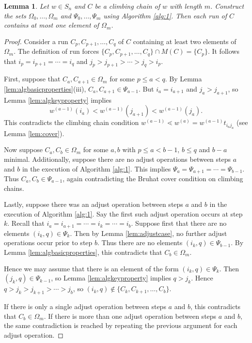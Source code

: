 \documentclass[11pt]{amsart}
\newtheorem{lemma}[theorem]{Lemma}
\theoremstyle{definition}
\theoremstyle{named}
\begin{document}
	\begin{lemma}
		\label{lem:atmostoneperrun}
		Let $w\in S_n$ and $C$ be a climbing chain of $w$ with length $m$. Construct the sets $\Omega_0,\ldots,\Omega_m$ and $\Psi_0,\ldots,\Psi_m$ using Algorithm \ref{alg:1}. Then each run of $C$ contains at most one element of $\Omega_m$.
	\end{lemma}
	\begin{proof}
		Consider a run $C_{p},C_{p+1},\ldots,C_{q}$ of $C$ containing at least two elements of $\Omega_m$. The definition of run forces $\{C_p,C_{p+1},\ldots,C_q\}\cap M(C) = \{C_p\}$. It follows that $i_p=i_{p+1}=\cdots=i_{q}$ and $j_p>j_{p+1}>\cdots>j_q>i_p$. 
		
		First, suppose that $C_a,C_{a+1}\in \Omega_m$ for some $p\leq a< q$. By Lemma \ref{lem:algbasicproperties}(iii), $C_a,C_{a+1}\in \Psi_{a-1}$. But $i_a=i_{a+1}$ and $j_a>j_{a+1}$, so Lemma \ref{lem:algkeyproperty} implies
		\[w^{(a-1)}(i_a) < w^{(a-1)}(j_{a+1}) < w^{(a-1)}(j_a). \]
		This contradicts the climbing chain condition $w^{(a-1)}\lessdot w^{(a)} = w^{(a-1)}t_{i_aj_a}$ (see Lemma \ref{lem:cover}).

		Now suppose $C_a,C_b\in \Omega_m$ for some $a,b$ with $p\leq a<b-1$, $b\leq q$ and $b-a$ minimal. Additionally, suppose there are no adjust operations between steps $a$ and $b$ in the execution of Algorithm \ref{alg:1}. This implies $\Psi_a=\Psi_{a+1}=\cdots=\Psi_{b-1}$. Thus $C_a,C_b\in \Psi_{a-1}$, again contradicting the Bruhat cover condition on climbing chains.
		
		Lastly, suppose there was an adjust operation between steps $a$ and $b$ in the execution of Algorithm \ref{alg:1}. Say the first such adjust operation occurs at step $k$. Recall that $i_a=i_{a+1}=\cdots=i_k=\cdots=i_b$. Suppose first that there are no elements $(i_k,q)\in \Psi_{k}$. Then by Lemma \ref{lem:adjustcase}, no further adjust operations occur prior to step $b$. Thus there are no elements $(i_k,q)\in \Psi_{b-1}$. By Lemma \ref{lem:algbasicproperties}, this contradicts that $C_b\in \Omega_m$.
		
		Hence we may assume that there is an element of the form $(i_k,q)\in \Psi_k$. Then $(j_k,q)\in \Psi_{k-1}$, so Lemma \ref{lem:algkeyproperty} implies $q>j_k$. Hence $q>j_k>j_{k+1}>\cdots>j_b$, so $(i_k,q)\notin \{C_k,C_{k+1},\ldots,C_{b}\}$. 
		
		If there is only a single adjust operation between steps $a$ and $b$, this contradicts that $C_b\in \Omega_m$. If there is more than one adjust operation between steps $a$ and $b$, the same contradiction is reached by repeating the previous argument for each adjust operation. 
	\end{proof}
\end{document}
